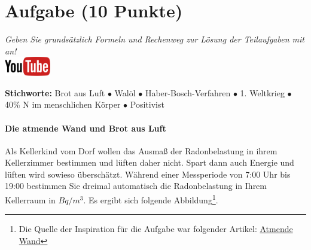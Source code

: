 \documentclass[a4paper, 9pt]{scrartcl}\usepackage[]{graphicx}\usepackage[]{xcolor}
\begin{document}
 
\clearpage

\section{Aufgabe \hfill (10 Punkte)}

\textit{Geben Sie grundsätzlich Formeln und Rechenweg zur L{\"o}sung der
  Teilaufgaben mit an!} \\[1Ex]

\hfill\href{https://youtu.be/4-dSaPMhK9s}{\includegraphics[width =
  2cm]{img/youtube}} %
\hspace{2Ex}

{\tiny\textbf{Stichworte:} Brot aus Luft $\bullet$ Walöl $\bullet$ Haber-Bosch-Verfahren $\bullet$ 1. Weltkrieg $\bullet$ 40\% N im menschlichen Körper $\bullet$ Positivist}

\paragraph{Die atmende Wand und Brot aus Luft}



Als Kellerkind vom Dorf wollen das Ausmaß der Radonbelastung in ihrem Kellerzimmer bestimmen und
lüften daher nicht. Spart dann auch Energie und lüften wird sowieso überschätzt. Während einer Messperiode von 7:00 Uhr bis
19:00 bestimmen Sie dreimal automatisch die Radonbelastung in
Ihrem Kellerraum in $Bq/m^3$. Es ergibt sich folgende Abbildung\footnote{Die Quelle der Inspiration
  für die Aufgabe war folgender Artikel:
  \href{https://de.wikipedia.org/wiki/Atmende_Wand}{Atmende Wand}}.
\end{document}

